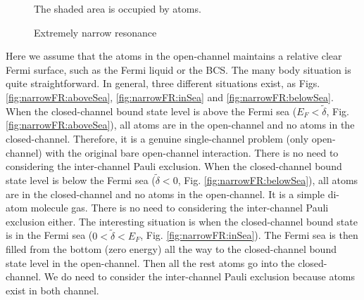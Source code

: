 \begin{figure}[hhtb]
	\centering
	         \quad
		\quad
	\caption{Extremely narrow resonance\label{fig:narrowFR}}
	\small{The shaded area is occupied by atoms. }
\end{figure}
Here we assume that the atoms in the open-channel maintains a relative clear Fermi surface, such as the Fermi liquid or the BCS.  The many body situation is  quite straightforward. In general, three different situations exist, as Figs. \ref{fig:narrowFR:aboveSea}, \ref{fig:narrowFR:inSea} and \ref{fig:narrowFR:belowSea}.  When the closed-channel bound state level is above the Fermi sea ($E_{F}<\tilde\delta$, Fig. \ref{fig:narrowFR:aboveSea}), all atoms are in the open-channel and no atoms in the closed-channel.  Therefore, it is a genuine  single-channel problem (only open-channel) with the original bare open-channel interaction.   There is no need to considering the inter-channel Pauli exclusion.  When the closed-channel bound state level is below the Fermi sea ($\tilde\delta<0$, Fig. \ref{fig:narrowFR:belowSea}), all atoms are in the closed-channel and no atoms in the open-channel.  It is a simple di-atom molecule gas. There is no need to considering the inter-channel Pauli exclusion either.  The interesting situation is when the closed-channel bound state is in the Fermi sea  ($0<\tilde\delta<E_{F}$, Fig. \ref{fig:narrowFR:inSea}).  The Fermi sea is then filled from the bottom (zero energy) all the way to the closed-channel bound state level in the open-channel.  Then all the rest atoms go into the closed-channel.  We do need to consider the inter-channel Pauli exclusion because atoms exist in both channel.  




